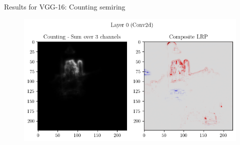 \documentclass[aspectratio=169]{beamer}
\theoremstyle{definition}
\begin{document}
\begin{frame}{Results for VGG-16: Counting semiring}
    \begin{figure}[H]
        \centering
        \includegraphics[width=.8\textwidth]{vgg-counting.png}
    \end{figure}
\end{frame}

\begin{frame}[allowframebreaks]
    \nocite{*}
    \printbibliography
\end{frame}
\end{document}
